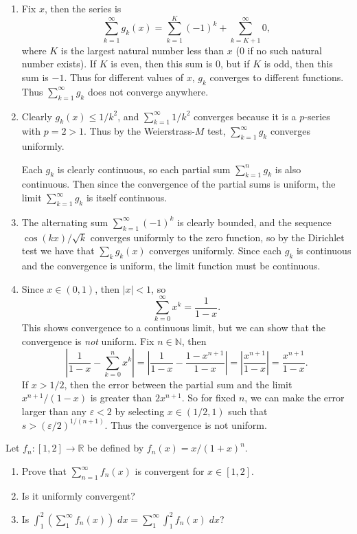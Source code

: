 \documentclass[10pt]{amsart}
\newenvironment{exercise}[1]{%
        \vspace{10mm}
        \renewcommand\themanualtheoreminner{#1}%
  \manualtheoreminner
}\hrulefill{\endmanualtheoreminner}
\begin{document}
\begin{enumerate}
	\item Fix $x$, then the series is
		\[
			\sum_{k=1}^{\infty} g_k(x) = \sum_{k=1}^{K} (-1)^k + \sum_{k=K+1}^{\infty} 0,
		\] where $K$ is the largest natural number less than $x$ (0 if no such natural number exists). If $K$ is even, then this sum is 0, but if $K$ is odd, then this sum is $-1$. Thus for different values of $x$, $g_k$ converges to different functions. Thus $\sum_{k=1}^{\infty} g_k$ does not converge anywhere.

	\item Clearly $g_k(x) \leq 1/k^2$, and $\sum_{k=1}^{\infty} 1/k^2$ converges because it is a $ p$-series with $p=2>1$. Thus by the Weierstrass-$M$ test, $\sum_{k=1}^{\infty} g_k$ converges uniformly.

		Each $g_k$ is clearly continuous, so each partial sum $\sum_{k=1}^{n} g_k$ is also continuous. Then since the convergence of the partial sums is uniform, the limit $\sum_{k=1}^{\infty} g_k$ is itself continuous.

	\item The alternating sum $\sum_{k=1}^{\infty} (-1)^k$ is clearly bounded, and the sequence $\cos(kx)/\sqrt{k} $ converges uniformly to the zero function, so by the Dirichlet test we have that $\sum_k g_k(x)$ converges uniformly. Since each $g_k$ is continuous and the convergence is uniform, the limit function must be continuous.

	\item Since $x \in (0,1)$, then $|x| < 1$, so
		\[
		\sum_{k=0}^{\infty} x^k = \frac{1}{1-x}.
		\] This shows convergence to a continuous limit, but we can show that the convergence is \textit{not} uniform. Fix $n \in \mathbb{N}$, then
		\[
		\left| \frac{1}{1-x} -\sum_{k=0}^{n} x^k \right|=\left| \frac{1}{1-x} - \frac{1-x^{n+1}}{1-x}  \right|=\left| \frac{x^{n+1}}{1-x}  \right| = \frac{x^{n+1}}{1-x} .
		\] 
		If $x>1/2$, then the error between the partial sum and the limit $x^{n+1}/(1-x)$ is greater than $2x^{n+1}$. So for fixed $n$, we can make the error larger than any $\varepsilon < 2$ by selecting $x \in (1/2, 1)$ such that $s > (\varepsilon/2)^{1/(n+1)}$. Thus the convergence is not uniform.
\end{enumerate}

\begin{exercise}{Page 317, Ex. 4}
	Let $f_n : [1,2] \to \mathbb{R}$ be defined by $f_n(x) = x/(1+x)^n$.
	\begin{enumerate}
		\item Prove that $\sum_{n=1}^{\infty} f_n(x)$ is convergent for $x \in [1,2]$.
		\item Is it uniformly convergent?
		\item Is $\int_{1}^{2} \left( \sum_{1}^{\infty} f_n(x) \right) \;dx = \sum_{1}^{\infty} \int_{1}^{2} f_n(x) \;dx$?
	\end{enumerate}
\end{exercise}
\end{document}
